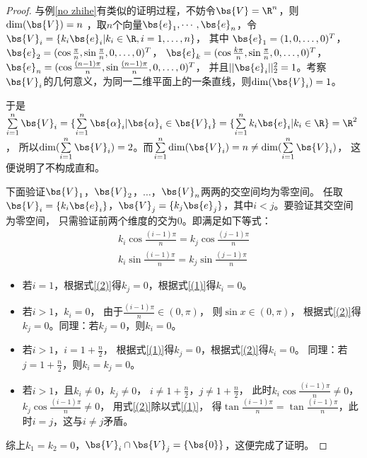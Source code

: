 \documentclass[12pt, a4paper, oneside, UTF8]{ctexbook}
\begin{document}
\begin{proof}
    与例\ref{no zhihe}有类似的证明过程，不妨令$\bs{V}=\R^n$，则$\mathrm{dim}(\bs{V})=n$
    ，取$n$个向量$\bs{e}_1,\cdots,\bs{e}_n$，令$\bs{V}_i=\{k_i\bs{e}_i|k_i\in\R,i=1,\ldots,n\}$，
    其中
    $\bs{e}_1=(1,0,\ldots,0)^T$，
    $\bs{e}_2=(\cos \frac{\pi}{n},\sin \frac{\pi}{n},0,\ldots,0)^T$，
    $\bs{e}_k=(\cos \frac{k\pi}{n},\sin \frac{\pi}{n},0,\ldots,0)^T$，
    $\bs{e}_n=(\cos \frac{(n-1)\pi}{n},\sin \frac{(n-1)\pi}{n},0,\ldots,0)^T$，
    并且$||\bs{e}_i||_2^2=1$。考察$\bs{V}_i$的几何意义，为同一二维平面上的一条直线，则$\mathrm{dim}(\bs{V}_i)=1$。

    于是$\sum\limits_{i=1}^n \bs{V}_i=\{\sum\limits_{i=1}^n \bs{\alpha}_i|\bs{\alpha}_i \in \bs{V}_i\}=
    \{\sum\limits_{i=1}^n k_i\bs{e}_i|k_i \in \R\}=\R^2$，
    所以$\mathrm{dim}(\sum\limits_{i=1}^n \bs{V}_i)=2$。而$\sum\limits_{i=1}^n \mathrm{dim}(\bs{V}_i)=n \neq \mathrm{dim}(\sum\limits_{i=1}^n \bs{V}_i)$，
    这便说明了不构成直和。
    
    下面验证$\bs{V}_1$，$\bs{V}_2$，$\ldots$，$\bs{V}_n$两两的交空间均为零空间。
    任取$\bs{V}_i=\{k_i\bs{e}_i\}$，$\bs{V}_j=\{k_j\bs{e}_j\}$，其中$i < j$。要验证其交空间为零空间，
    只需验证前两个维度的交为0。即满足如下等式：
    \begin{align}
    k_i\cos \frac{(i-1)\pi}{n}=k_j \cos \frac{(j-1)\pi}{n} \label{(1)} \\
    k_i\sin \frac{(i-1)\pi}{n}=k_j \sin \frac{(j-1)\pi}{n} \label{(2)}
    \end{align}
\begin{itemize}
    \item 若$i=1$，根据式\eqref{(2)}得$k_j=0$，根据式\eqref{(1)}得$k_i=0$。
    \item 若$i>1$，$k_i=0$，
    由于$\frac{(i-1)\pi}{n} \in (0,\pi)$，
    则$\sin x \in (0,\pi)$，
    根据式\eqref{(2)}得$k_j=0$。同理：若$k_j=0$，则$k_i=0$。
    \item 若$i>1$，$i=1+\frac{n}{2}$，
    根据式\eqref{(1)}得$k_j=0$，根据式\eqref{(2)}得$k_i=0$。
    同理：若$j=1+\frac{n}{2}$，则$k_i=k_j=0$。
    \item 若$i>1$，且$k_i\neq 0$，$k_j \neq 0$，
    $i\neq 1+\frac{n}{2}$，$j \neq 1+\frac{n}{2}$，
    此时$k_i\cos \frac{(i-1)\pi}{n} \neq 0$，$k_j\cos \frac{(i-1)\pi}{n} \neq 0$，
    用式\eqref{(2)}除以式\eqref{(1)}，
    得$\tan \frac{(i-1)\pi}{n}=\tan \frac{(i-1)\pi}{n}$，此时$i= j$，这与$i \neq j$矛盾。
\end{itemize}
综上$k_1=k_2=0$，$\bs{V}_i \cap \bs{V}_j =\{\bs{0}\}$，这便完成了证明。

\end{proof}
\end{document}
